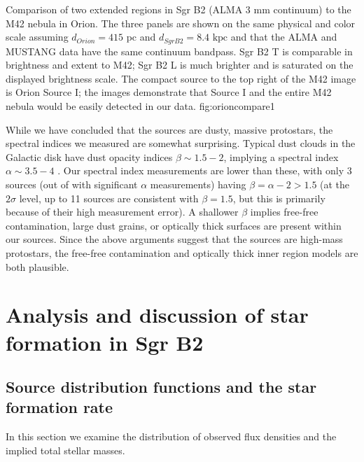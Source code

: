 \documentclass[twocolumn]{aastex61}
\newcommand{\dsgrb}{\ensuremath{8.4\textrm{~kpc}}\xspace}
\begin{document}
{Comparison of two extended \hii regions in Sgr B2 (ALMA 3 mm continuum) to the
M42 \citep[GBT MUSTANG 3 mm continuum;][]{Dicker2009a} nebula in Orion.
The three panels are shown on the same physical and color scale assuming
$d_{Orion} = 415$ pc and $d_{Sgr B2} = $\dsgrb and that the ALMA and MUSTANG
data have the same continuum bandpass.  Sgr B2 \hii T is comparable in
brightness and extent to M42; Sgr B2 \hii L is much brighter and is saturated
on the displayed brightness scale.  The compact source to the top right of the
M42 image is Orion Source I; the images demonstrate that Source I and the entire
M42 nebula would be easily detected in our data.
}
{fig:orioncompare}{1}{\textwidth}

While we have concluded that the sources are dusty, massive protostars, the
spectral indices we measured are somewhat surprising.  Typical dust clouds in
the Galactic disk have dust opacity indices $\beta\sim1.5-2$, implying 
a spectral index $\alpha\sim3.5-4$
\citep{Schnee2010a,Shirley2011a,Sadavoy2016a}.  Our spectral index measurements
are lower
than these, with only 3 sources (out of \nalphas with significant $\alpha$
measurements) having $\beta=\alpha-2 > 1.5$ (at the
$2\sigma$ level, up to 11 sources are consistent with $\beta=1.5$, but this is
primarily because of their high measurement error).  A shallower $\beta$
implies free-free contamination, large dust grains, or optically thick surfaces
are present within our sources.  Since the above arguments suggest that the
sources are high-mass protostars, the free-free contamination and optically
thick inner region models are both plausible.

\section{Analysis and discussion of star formation in Sgr B2}
\subsection{Source distribution functions and the star formation rate}
\label{sec:distributionsandsfr}

In this section we examine the distribution of observed flux densities and the
implied total stellar masses.  

\end{document}
